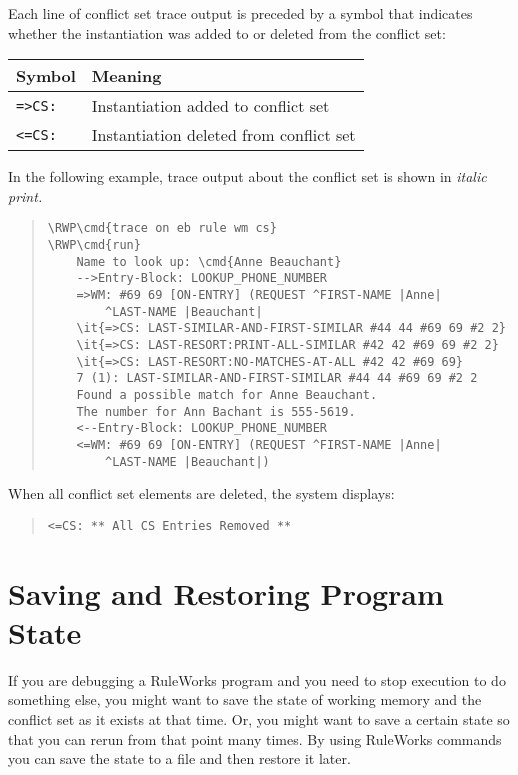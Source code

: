 Each line of conflict set trace output is preceded by a symbol that
indicates whether the instantiation was added to or deleted from the
conflict set:

\begin{center}
\begin{tabular}{ll}
  \toprule
  Symbol & Meaning \\
  \midrule
  \verb|=>CS:| & Instantiation added to conflict set \\
  \verb|<=CS:| & Instantiation deleted from conflict set \\
  \bottomrule
\end{tabular}
\end{center}

In the following example, trace output about the conflict set is
shown in \it{italic} print.

\begin{quote}
\begin{Verbatim}[commandchars=\\\{\}]
\RWP\cmd{trace on eb rule wm cs}
\RWP\cmd{run}
    Name to look up: \cmd{Anne Beauchant}
    -->Entry-Block: LOOKUP_PHONE_NUMBER
    =>WM: #69 69 [ON-ENTRY] (REQUEST ^FIRST-NAME |Anne| 
        ^LAST-NAME |Beauchant|
    \it{=>CS: LAST-SIMILAR-AND-FIRST-SIMILAR #44 44 #69 69 #2 2}
    \it{=>CS: LAST-RESORT:PRINT-ALL-SIMILAR #42 42 #69 69 #2 2}
    \it{=>CS: LAST-RESORT:NO-MATCHES-AT-ALL #42 42 #69 69}
    7 (1): LAST-SIMILAR-AND-FIRST-SIMILAR #44 44 #69 69 #2 2
    Found a possible match for Anne Beauchant. 
    The number for Ann Bachant is 555-5619.
    <--Entry-Block: LOOKUP_PHONE_NUMBER
    <=WM: #69 69 [ON-ENTRY] (REQUEST ^FIRST-NAME |Anne|
        ^LAST-NAME |Beauchant|)
\end{Verbatim}
\end{quote}

When all conflict set elements are deleted, the system displays:

\begin{quote}
\begin{verbatim}
<=CS: ** All CS Entries Removed **
\end{verbatim}
\end{quote}

\section{Saving and Restoring Program State}

If you are debugging a RuleWorks program and you need to stop
execution to do something else, you might want to save the state
of working memory and the conflict set as it exists at that
time. Or, you might want to save a certain state so that you can
rerun from that point many times. By using RuleWorks commands
you can save the state to a file and then restore it later.

